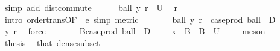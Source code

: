 \begin{isabellebody}
\ {\isacharparenleft}{\kern0pt}simp\ add{\isacharcolon}{\kern0pt}\ dist{\isacharunderscore}{\kern0pt}commute{\isacharparenright}{\kern0pt}\isanewline
\ \ \ \ \isamarkupfalse%
\ {\isachardoublequoteopen}ball\ y\ r\ {\isasymsubseteq}\ U{\isachardoublequoteclose}\ \isamarkupfalse%
\ r\ \isamarkupfalse%
\ {\isacharparenleft}{\kern0pt}intro\ order{\isacharunderscore}{\kern0pt}trans{\isacharbrackleft}{\kern0pt}OF\ {\isacharunderscore}{\kern0pt}\ e{\isacharparenleft}{\kern0pt}{}{\isacharparenright}{\kern0pt}{\isacharbrackright}{\kern0pt}{\isacharcomma}{\kern0pt}\ simp{\isacharcomma}{\kern0pt}\ metric{\isacharparenright}{\kern0pt}\isanewline
\ \ \ \ \isamarkupfalse%
\ \isamarkupfalse%
\ {\isachardoublequoteopen}ball\ y\ r\ {\isasymin}\ {\isacharparenleft}{\kern0pt}case{\isacharunderscore}{\kern0pt}prod\ ball\ {\isacharbackquote}{\kern0pt}\ {\isacharparenleft}{\kern0pt}D\ {\isasymtimes}\ {\isacharparenleft}{\kern0pt}{\isasymrat}\ {\isasyminter}\ {\isacharbraceleft}{\kern0pt}{}{\isacharless}{\kern0pt}{\isachardot}{\kern0pt}{\isachardot}{\kern0pt}{\isacharbraceright}{\kern0pt}{\isacharparenright}{\kern0pt}{\isacharparenright}{\kern0pt}{\isacharparenright}{\kern0pt}{\isachardoublequoteclose}\ \isamarkupfalse%
\ y{\isacharparenleft}{\kern0pt}{}{\isacharparenright}{\kern0pt}\ r\ \isamarkupfalse%
\ force\isanewline
\ \ \ \ \isamarkupfalse%
\ \isamarkupfalse%
\ {\isachardoublequoteopen}{\isasymexists}B{\isacharprime}{\kern0pt}{\isasymin}{\isacharparenleft}{\kern0pt}case{\isacharunderscore}{\kern0pt}prod\ ball\ {\isacharbackquote}{\kern0pt}\ {\isacharparenleft}{\kern0pt}D\ {\isasymtimes}\ {\isacharparenleft}{\kern0pt}{\isasymrat}\ {\isasyminter}\ {\isacharbraceleft}{\kern0pt}{}{\isacharless}{\kern0pt}{\isachardot}{\kern0pt}{\isachardot}{\kern0pt}{\isacharbraceright}{\kern0pt}{\isacharparenright}{\kern0pt}{\isacharparenright}{\kern0pt}{\isacharparenright}{\kern0pt}{\isachardot}{\kern0pt}\ x\ {\isasymin}\ B{\isacharprime}{\kern0pt}\ {\isasymand}\ B{\isacharprime}{\kern0pt}\ {\isasymsubseteq}\ U{\isachardoublequoteclose}\ \isamarkupfalse%
\ {\isacharasterisk}{\kern0pt}\ \isamarkupfalse%
\ meson\isanewline
\ \ \isamarkupfalse%
\isanewline
\ \ \isamarkupfalse%
\ {\isacharquery}{\kern0pt}thesis\ \isamarkupfalse%
\ that\ dense{\isacharunderscore}{\kern0pt}subset\ \isamarkupfalse%

\end{isabellebody}
